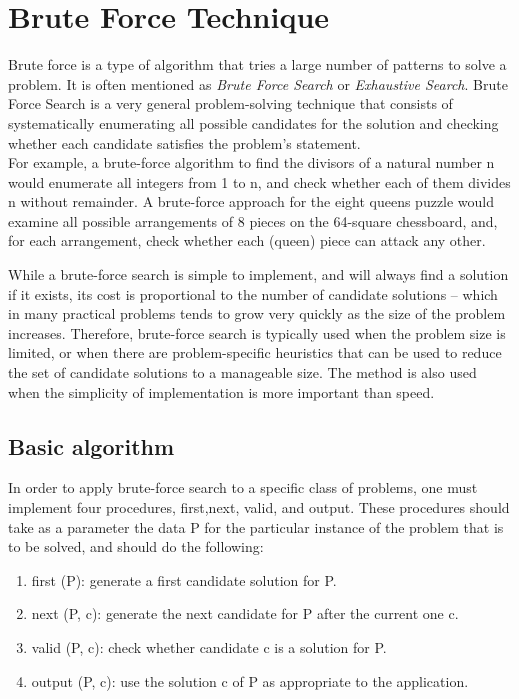 \documentclass{report}
\begin{document}
    \section{Brute Force Technique}
    Brute force is a type of algorithm that tries a large number of patterns to solve a problem. It is often mentioned as \textit{Brute Force Search} or \textit{Exhaustive Search}. Brute Force Search is a very general problem-solving technique that consists of systematically enumerating all possible candidates for the solution and checking whether each candidate satisfies the problem's statement.\\
    For example, a brute-force algorithm to find the divisors of a natural number n would enumerate all integers from 1 to n, and check whether each of them divides n without remainder. A brute-force approach for the eight queens puzzle would examine all possible arrangements of 8 pieces on the 64-square chessboard, and, for each arrangement, check whether each (queen) piece can attack any other.
    
    \bigskip
    While a brute-force search is simple to implement, and will always find a solution if it exists, its cost is proportional to the number of candidate solutions – which in many practical problems tends to grow very quickly as the size of the problem increases. Therefore, brute-force search is typically used when the problem size is limited, or when there are problem-specific heuristics that can be used to reduce the set of candidate solutions to a manageable size. The method is also used when the simplicity of implementation is more important than speed.
    
    \subsection*{Basic algorithm}
    In order to apply brute-force search to a specific class of problems, one must implement four procedures, first,next, valid, and output. These procedures should take as a parameter the data P for the particular instance of the problem that is to be solved, and should do the following:
    
    \begin{enumerate}
        \item first (P): generate a first candidate solution for P.
        \item next (P, c): generate the next candidate for P after the current one c.
        \item valid (P, c): check whether candidate c is a solution for P.
        \item output (P, c): use the solution c of P as appropriate to the application.
    \end{enumerate}
    
\end{document}

